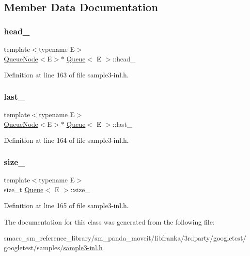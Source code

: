 \subsection{Member Data Documentation}
\mbox{\label{classQueue_abf9219bcea800d26e8bfdb4777d98729}} 
\subsubsection{\texorpdfstring{head\+\_\+}{head\_}}
{\footnotesize\ttfamily template$<$typename E$>$ \\
\hyperlink{classQueueNode}{Queue\+Node}$<$E$>$$\ast$ \hyperlink{classQueue}{Queue}$<$ E $>$\+::head\+\_\+\hspace{0.3cm}{\ttfamily [private]}}



Definition at line 163 of file sample3-\/inl.\+h.

\mbox{\label{classQueue_a7466dca4f96147c9124af582ab170df0}} 
\subsubsection{\texorpdfstring{last\+\_\+}{last\_}}
{\footnotesize\ttfamily template$<$typename E$>$ \\
\hyperlink{classQueueNode}{Queue\+Node}$<$E$>$$\ast$ \hyperlink{classQueue}{Queue}$<$ E $>$\+::last\+\_\+\hspace{0.3cm}{\ttfamily [private]}}



Definition at line 164 of file sample3-\/inl.\+h.

\mbox{\label{classQueue_a7ac3c0717d894e1aecc56f4ddb35c7ea}} 
\subsubsection{\texorpdfstring{size\+\_\+}{size\_}}
{\footnotesize\ttfamily template$<$typename E$>$ \\
size\+\_\+t \hyperlink{classQueue}{Queue}$<$ E $>$\+::size\+\_\+\hspace{0.3cm}{\ttfamily [private]}}



Definition at line 165 of file sample3-\/inl.\+h.



The documentation for this class was generated from the following file\+:\begin{DoxyCompactItemize}
\item 
smacc\+\_\+sm\+\_\+reference\+\_\+library/sm\+\_\+panda\+\_\+moveit/libfranka/3rdparty/googletest/googletest/samples/\hyperlink{sample3-inl_8h}{sample3-\/inl.\+h}\end{DoxyCompactItemize}
